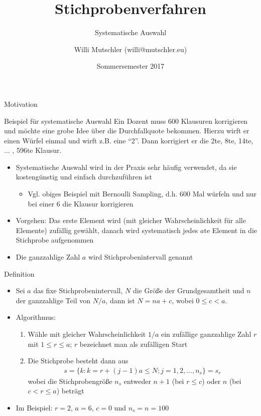\documentclass[9pt]{beamer}
\title{Stichprobenverfahren}
\subtitle{Systematische Auswahl}
\date[SS2017]{Sommersemester 2017}
\author{Willi Mutschler (willi@mutschler.eu)}
\begin{document}
\maketitle

\begin{frame}{Motivation}
\begin{block}{Beispiel für systematische Auswahl}
Ein Dozent muss 600 Klausuren korrigieren und möchte eine grobe Idee über die Durchfallquote bekommen. Hierzu wirft er einen Würfel einmal und wirft z.B. eine \enquote{2}. Dann korrigiert er die 2te, 8te, 14te, ... , 596te Klausur.
\end{block}
\begin{itemize}
	\item Systematische Auswahl wird in der Praxis sehr häufig verwendet, da sie kostengünstig und einfach durchzuführen ist 
	\begin{itemize}
		\item Vgl. obiges Beispiel mit Bernoulli Sampling, d.h. 600 Mal würfeln und nur bei einer 6 die Klausur korrigieren
	\end{itemize}
	\item Vorgehen: Das erste Element wird (mit gleicher Wahrscheinlichkeit für alle Elemente) zufällig gewählt, danach wird systematisch jedes $a$te Element in die Stichprobe aufgenommen
	\item Die ganzzahlige Zahl $a$ wird Stichprobenintervall genannt
\end{itemize}
\end{frame}

\begin{frame}{Definition}
\begin{itemize}
	\item Sei $a$ das fixe Stichprobenintervall, $N$ die Größe der Grundgesamtheit und $n$ der ganzzahlige Teil von $N/a$, dann
ist $N = na + c$, wobei $0\leq c < a$.
	\item Algorithmus:
	\begin{enumerate}
		\item Wähle mit gleicher Wahrscheinlichkeit $1/a$ ein zufällige ganzzahlige Zahl $r$ mit $1\leq r \leq a$; $r$ bezeichnet man als zufälligen Start
		\item Die Stichprobe besteht dann aus
		\begin{align*}
			s = \{k:k=r+(j-1)a\leq N;j=1,2,...,n_s\} = s_r
		\end{align*}
		wobei die Stichprobengröße $n_s$ entweder $n+1$ (bei $r\leq c$) oder $n$ (bei $c<r\leq a$) beträgt
	\end{enumerate}
	\item Im Beispiel: $r=2$, $a=6$, $c=0$ und $n_s=n=100$
\end{itemize}
\end{frame}
\end{document}
